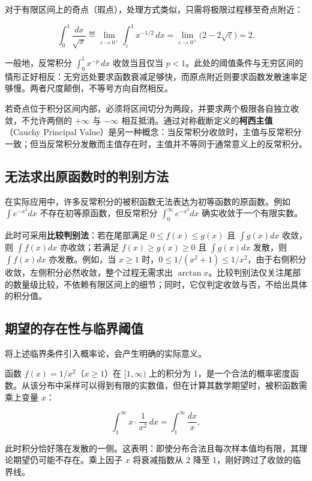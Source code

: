 对于有限区间上的奇点（瑕点），处理方式类似，只需将极限过程移至奇点附近：

\[
\int_0^1\frac{dx}{\sqrt x}
\eqdef\lim_{\varepsilon\to0^+}\int_\varepsilon^1 x^{-1/2}\,dx
=\lim_{\varepsilon\to0^+}\bigl(2-2\sqrt\varepsilon\bigr)=2 .
\]

一般地，反常积分 \(\int_0^1 x^{-p}\,dx\) 收敛当且仅当 \(p<1\)。此处的阈值条件与无穷区间的情形正好相反：无穷远处要求函数衰减足够快，而原点附近则要求函数发散速率足够慢。两者尺度颠倒，不等号方向自然相反。

若奇点位于积分区间内部，必须将区间切分为两段，并要求两个极限各自独立收敛，不允许两侧的 \(+\infty\) 与 \(-\infty\) 相互抵消。通过对称截断定义的\textbf{柯西主值}（Cauchy Principal Value）是另一种概念：当反常积分收敛时，主值与反常积分一致；但当反常积分发散而主值存在时，主值并不等同于通常意义上的反常积分。

\subsection{无法求出原函数时的判别方法}

在实际应用中，许多反常积分的被积函数无法表达为初等函数的原函数。例如 \(\int e^{-x^2}dx\) 不存在初等原函数，但反常积分 \(\int_0^\infty e^{-x^2}dx\) 确实收敛于一个有限实数。

此时可采用\textbf{比较判别法}：若在尾部满足 \(0\le f(x)\le g(x)\) 且 \(\int g(x)dx\) 收敛，则 \(\int f(x)dx\) 亦收敛；若满足 \(f(x)\ge g(x)\ge0\) 且 \(\int g(x)dx\) 发散，则 \(\int f(x)dx\) 亦发散。例如，当 \(x\ge1\) 时，\(0\le 1/(x^2+1)\le 1/x^2\)，由于右侧积分收敛，左侧积分必然收敛，整个过程无需求出 \(\arctan x\)。比较判别法仅关注尾部的数量级比较，不依赖有限区间上的细节；同时，它仅判定收敛与否，不给出具体的积分值。

\subsection{期望的存在性与临界阈值}

将上述临界条件引入概率论，会产生明确的实际意义。

函数 \(f(x)=1/x^2\)（\(x\ge1\)）在 \([1,\infty)\) 上的积分为 1，是一个合法的概率密度函数。从该分布中采样可以得到有限的实数值，但在计算其数学期望时，被积函数需乘上变量 \(x\)：

\[
\int_1^\infty x\cdot\frac{1}{x^2}\,dx=\int_1^\infty\frac{dx}{x},
\]

此时积分恰好落在发散的一侧。这表明：即使分布合法且每次样本值均有限，其理论期望仍可能不存在。乘上因子 \(x\) 将衰减指数从 2 降至 1，刚好跨过了收敛的临界线。

